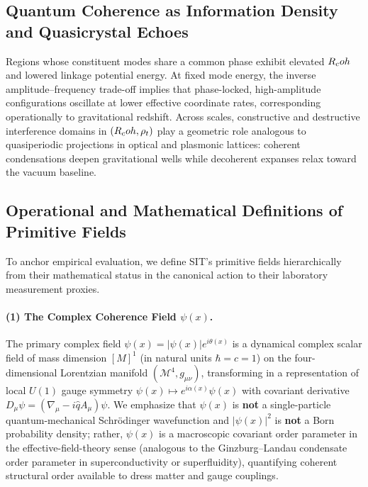 \subsection*{Quantum Coherence as Information Density and Quasicrystal Echoes}

Regions whose constituent modes share a common phase exhibit elevated $R_coh$ and lowered linkage potential energy. At fixed mode energy, the inverse amplitude--frequency trade-off implies that phase-locked, high-amplitude configurations oscillate at lower effective coordinate rates, corresponding operationally to gravitational redshift. Across scales, constructive and destructive interference domains in $(R_coh, \rho_t)$ play a geometric role analogous to quasiperiodic projections in optical and plasmonic lattices: coherent condensations deepen gravitational wells while decoherent expanses relax toward the vacuum baseline.

\subsection{Operational and Mathematical Definitions of Primitive Fields}
\label{sec:PrimitiveFieldDefinitions}
\label{sec:math}

To anchor empirical evaluation, we define SIT's primitive fields hierarchically from their mathematical status in the canonical action to their laboratory measurement proxies.

\paragraph{(1) The Complex Coherence Field $\psi(x)$.}
The primary complex field $\psi(x) = |\psi(x)| e^{i\theta(x)}$ is a dynamical complex scalar field of mass dimension $[M]^1$ (in natural units $\hbar = c = 1$) on the four-dimensional Lorentzian manifold $(\mathcal{M}^4, g_{\mu\nu})$, transforming in a representation of local $U(1)$ gauge symmetry $\psi(x) \mapsto e^{i\alpha(x)}\psi(x)$ with covariant derivative $D_\mu\psi = (\nabla_\mu - i\hat{q}A_\mu)\psi$. We emphasize that $\psi(x)$ is \textbf{not} a single-particle quantum-mechanical Schr\"odinger wavefunction and $|\psi(x)|^2$ is \textbf{not} a Born probability density; rather, $\psi(x)$ is a macroscopic covariant order parameter in the effective-field-theory sense (analogous to the Ginzburg--Landau condensate order parameter in superconductivity or superfluidity), quantifying coherent structural order available to dress matter and gauge couplings.

